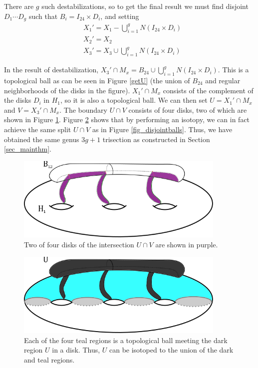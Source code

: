 \documentclass[12pt]{amsart}
\theoremstyle{definition}
\theoremstyle{remark}
\begin{document}
There are $g$ such destabilizations, so to get the final result we must find disjoint $D_1 \cdots D_g$ such that $B_i = I_{24} \times D_i$, and setting
\begin{align*}
&X_1' = X_1 - \bigcup_{i=1}^g N(I_{24} \times D_i) \\
&X_2' = X_2\\
&X_3' = X_3 \cup \bigcup_{i=1}^g N(I_{24} \times D_i)
\end{align*}

In the result of destabilization, $X_3' \cap M_x = B_{24} \cup \bigcup_{i=1}^g N(I_{24} \times D_i)$.
This is a topological ball as can be seen in Figure \ref{getU} (the union of $B_{24}$ and regular neighborhoods of the disks in the figure).
$X_1' \cap M_x$ consists of the complement of the disks $D_i$ in $H_1$, so it is also a topological ball.  
We can then set  $U=X_1' \cap M_x$ and $V = X_3' \cap M_x$.  The boundary $U \cap V$ consists of four disks, two of which are shown in Figure \ref{fig_uvboundary}.  Figure \ref{fig_splittinguv} shows that by performing an isotopy, we can in fact achieve the same split $U \cap V$ as in Figure \ref{fig_disjointballs}.
Thus, we have obtained the same genus $3g+1$ trisection as constructed in Section \ref{sec_mainthm}.

\begin{figure}[h]
\centering
\includegraphics[height=1.6in]{UVboundary.png}
\caption{Two of four disks of the intersection $U \cap V$ are shown in purple.
}
\label{fig_uvboundary}
\end{figure}

\begin{figure}[h]
\centering
\includegraphics[height=1.6in]{splittingUV.png}
\caption{Each of the four teal regions is a topological ball meeting the dark region $U$ in a disk.  Thus, $U$ can be isotoped to the union of the dark and teal regions.
}
\label{fig_splittinguv}
\end{figure}
\end{document}
